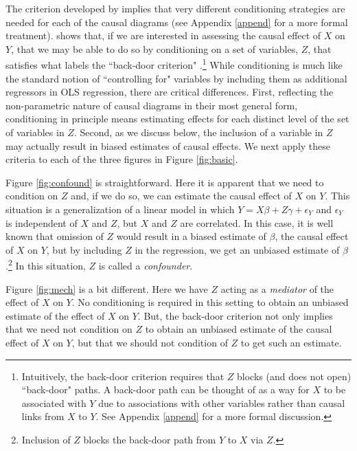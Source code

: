 \documentclass[11pt,reqno,titlepage]{amsart}
\begin{document}
\begin{doublespace}
The criterion developed by \citet{Pearl:2009vo} implies that very different conditioning strategies are needed for each of the causal diagrams (see Appendix \ref{append} for a more formal treatment). 
\citet{Pearl:2009vo} shows that, if we are interested in assessing the causal effect of $X$ on $Y$, that we may be able to do so by conditioning on a set of variables, $Z$, that satisfies what \citet{Pearl:2009vo} labels the ``back-door criterion" \citep[p.79]{Pearl:2009vo}.\footnote{
Intuitively, the back-door criterion requires that $Z$ blocks (and does not open) ``back-door" paths.
A back-door path can be thought of as a way for $X$ to be associated with $Y$ due to associations with other variables rather than causal links from $X$ to $Y$.
See Appendix \ref{append} for a more formal discussion.}
While conditioning is much like the standard notion of ``controlling for" variables by including them as additional regressors in OLS regression, there are critical differences.
First, reflecting the non-parametric nature of causal diagrams in their most general form, conditioning in principle means estimating effects for each distinct level of the set of variables in $Z$.
Second, as we discuss below, the inclusion of a variable in $Z$ may actually result in biased estimates of causal effects.
We next apply these criteria to each of the three figures in Figure \ref{fig:basic}.	

Figure \ref{fig:confound} is straightforward. 
Here it is apparent that we need to condition on $Z$ and, if we do so, we can estimate the causal effect of $X$ on $Y$.
This situation is a generalization of a linear model in which $Y = X \beta + Z \gamma + \epsilon_Y$ and $\epsilon_Y$ is independent of $X$ and $Z$, but $X$ and $Z$ are correlated.
In this case, it is well known that omission of $Z$ would result in a biased estimate of $\beta$, the causal effect of $X$ on $Y$, but by including $Z$ in the regression, we get an unbiased estimate of $\beta$.\footnote{
Inclusion of $Z$ blocks the back-door path from $Y$ to $X$ via $Z$.}
In this situation, $Z$ is called a \emph{confounder}.

Figure \ref{fig:mech} is a bit different. Here we have $Z$ acting as a \emph{mediator} of the effect of $X$ on $Y$.
No conditioning is required in this setting to obtain an unbiased estimate of the effect of $X$ on $Y$.
But, the back-door criterion not only implies that we need not condition on $Z$ to obtain an unbiased estimate of the causal effect of $X$ on $Y$, but that we should not condition of $Z$ to get such an estimate.


\end{doublespace}
\end{document}
